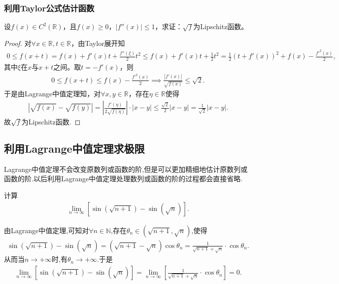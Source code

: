 \documentclass[../../main.tex]{subfiles}%
\begin{document}
\subsubsection{利用Taylor公式估计函数}

\begin{example}
设$f(x)\in C^2(\mathbb{R})$，且$f(x)\geqslant 0$，$|f''(x)|\leqslant 1$，求证：$\sqrt{f}$为Lipschitz函数。
\end{example}
\begin{proof}

对$\forall x\in\mathbb{R}, t\in\mathbb{R}$，由Taylor展开知
\begin{align*}
0\leqslant f(x+t)=f(x)+f'(x)t+\frac{f''(\xi)}{2}t^2\leqslant f(x)+f'(x)t+\frac{1}{2}t^2
= \frac{1}{2}(t+f'(x))^2 + f(x) - \frac{f'^2(x)}{2},
\end{align*}
其中$\xi$在$x$与$x+t$之间。取$t=-f'(x)$，则
\begin{align*}
0\leqslant f(x+t)\leqslant f(x) - \frac{f'^2(x)}{2} \implies \frac{|f'(x)|}{\sqrt{f(x)}}\leqslant \sqrt{2}.
\end{align*}
于是由Lagrange中值定理知，对$\forall x,y\in\mathbb{R}$，存在$\eta\in\mathbb{R}$使得
\begin{align*}
|\sqrt{f(x)} - \sqrt{f(y)}| = \left|\frac{f'(\eta)}{2\sqrt{f(\eta)}}\right|\cdot |x-y| \leqslant \frac{\sqrt{2}}{2}|x-y| = \frac{1}{\sqrt{2}}|x-y|.
\end{align*}
故$\sqrt{f}$为Lipschitz函数.

\end{proof}



\subsection{利用Lagrange中值定理求极限}
Lagrange中值定理不会改变原数列或函数的阶,但是可以更加精细地估计原数列或函数的阶.以后利用Lagrange中值定理处理数列或函数的阶的过程都会直接省略.

\begin{example}
计算
\begin{align*}
\lim_{n \to \infty} [\sin(\sqrt{n + 1}) - \sin(\sqrt{n})].
\end{align*}
\end{example}
\begin{solution}

由Lagrange中值定理,可知对$\forall n\in\mathbb{N}$,存在$\theta_n \in(\sqrt{n+1},\sqrt{n})$,使得
\begin{align*}
\sin(\sqrt{n+1})-\sin(\sqrt{n})=(\sqrt{n+1}-\sqrt{n})\cos\theta_n=\frac{1}{\sqrt{n+1}+\sqrt{n}}\cdot \cos\theta_n.
\end{align*}
从而当$n\to +\infty$时,有$\theta_n \to +\infty$.于是
\begin{align*}
\lim_{n \to \infty} [\sin(\sqrt{n + 1}) - \sin(\sqrt{n})]=\lim_{n \to \infty} [\frac{1}{\sqrt{n+1}+\sqrt{n}}\cdot \cos\theta_n]=0.
\end{align*}

\end{solution}
\end{document}
